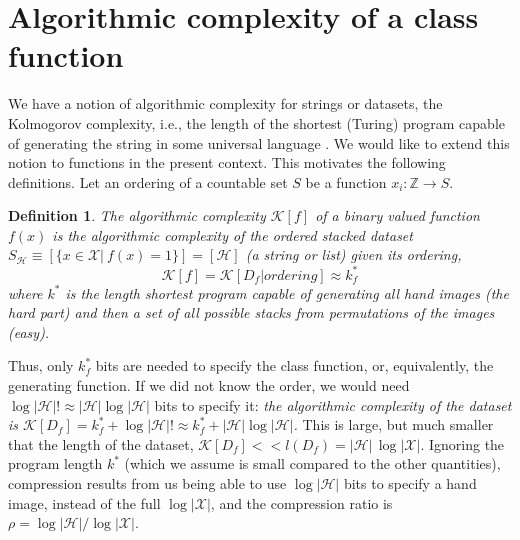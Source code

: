 \documentclass[11pt]{amsart}
\newcommand{\argmax}{\operatornamewithlimits{argmax}}
\newcommand{\inputspace}{\mathcal X}
\newcommand{\handspace}{\mathcal H}
\newtheorem{definition}{Definition} %
\begin{document}
\section{Algorithmic complexity of a class function}
We have a notion of algorithmic complexity for strings or datasets, the  Kolmogorov complexity, i.e., the length of the shortest  (Turing) program capable of generating the string in some universal language \cite{Cover:2006aa}. We would like to extend this notion  to functions in the present context. This motivates the following definitions. Let an ordering of a countable set $S$ be a function $x_{i}: \mathbb{Z} \rightarrow S$.


\begin{definition} The algorithmic complexity ${\mathcal K}[f]$  of a binary valued function $f(x)$   is the algorithmic complexity of the ordered stacked dataset  $S_{ \mathcal  H}\equiv [ \{x  \in \inputspace | \: f(x)=1\}] = [ \handspace]$ (a string or list) given its ordering,   %
 $$
\mathcal K[{f }]= \mathcal K[D_{f } | ordering]   \approx k_{f}^{*} 
 $$ 
 where $k^{*}$ is the length shortest program capable of generating all hand images (the hard part) and then a set of all possible stacks from permutations of the images (easy).
 \end{definition}
 
 Thus, only $k_{f}^{*} $ bits are needed to specify the class function, or, equivalently,  the generating function. 
If we did not know the order, we would need $\log |\handspace| ! \approx |\handspace| \log |\handspace| $ bits to specify it:  {\em  the algorithmic complexity of the dataset is $\mathcal K[{D_{f} }] = k_{f}^{*}  + \log |\handspace| ! \approx  k_{f}^{*}  +  |\handspace| \log |\handspace| $. }
This is large, but much smaller that the length of the dataset, 
$\mathcal K[{D_{f} }]  << l(D_{f})=|\handspace|\, \log |\inputspace|$.  
Ignoring the program length  $k^{*}$  (which we assume is small compared to the other quantities), compression results from us being able to use  $\log |\handspace| $ bits to specify a hand image, instead of the full $ \log |\inputspace| $, and the compression ratio is $\rho=   \log |\handspace | / \log |\inputspace|$.  




\end{document}
